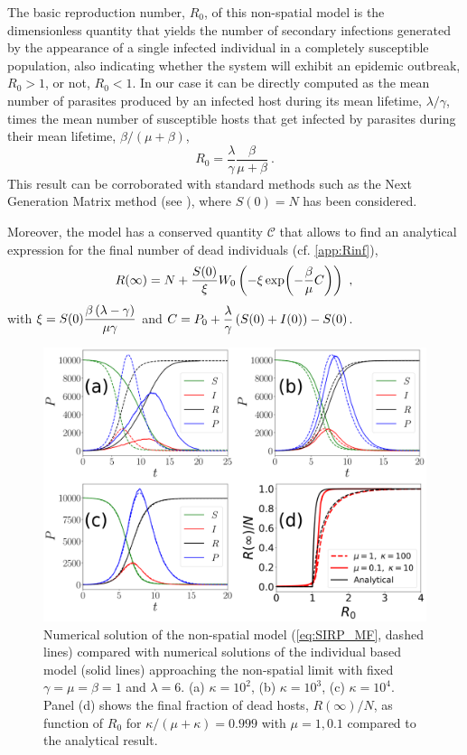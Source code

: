 The basic reproduction number, $R_0$, of this non-spatial model is the
dimensionless quantity that yields the number of secondary infections generated
by the appearance of a single infected individual in a completely susceptible
population, also indicating whether the system will exhibit an epidemic
outbreak, $R_0>1$, or not, $R_0<1$.
In our case it can be directly computed as the mean number of parasites
produced by an infected host during its mean lifetime, $\lambda/\gamma$, times
the mean number of susceptible hosts that get infected by parasites during
their mean lifetime, $\beta/(\mu+\beta)$,
\begin{equation}\label{eq:R0_MF}
    R_0=\frac{\lambda}{\gamma}\frac{\beta}{\mu+\beta} \ .
\end{equation}
This result can be corroborated with standard methods such as the Next
Generation Matrix method \cite{Diekmann2010} (see \cite{GimenezRomero2021}),
where $S(0)=N$ has been considered.

Moreover, the model has a conserved quantity $\mathcal{C}$
\cite{GimenezRomero2021} that allows to find an analytical expression for the
final number of dead individuals (cf. \cref{app:Rinf}),
\begin{equation}\label{eq:R_inf}
    R(\infty)=N+\frac{S(0)}{\xi}W_0\left(-\xi\exp(-\frac{\beta}{\mu}C)\right) \
    ,
\end{equation}
with $\displaystyle\xi=S(0)\frac{\beta\left(\lambda-\gamma\right)}{\mu\gamma}$
and $\displaystyle C=P_0+\frac{\lambda}{\gamma}\left(S(0)+I(0)\right)-S(0)$.

\begin{figure}[H]
    \centering
    \includegraphics[width=\columnwidth]{Figures/MF_comparison.png}
    \caption{Numerical solution of the non-spatial model (\cref{eq:SIRP_MF},
        dashed lines) compared with numerical solutions of the individual based
        model
        (solid lines) approaching the non-spatial limit with fixed
        $\gamma=\mu=\beta=1$
        and $\lambda=6$. (a) $\kappa=10^2$, (b) $\kappa=10^3$, (c)
        $\kappa=10^4$. Panel
        (d) shows the final fraction of dead hosts, $R(\infty)/N$, as function
        of $R_0$
        for $\kappa/(\mu+\kappa)=0.999$ with $\mu=1,0.1$ compared to the
        analytical
        result.}
    \label{fig:MF_limit}
\end{figure}


